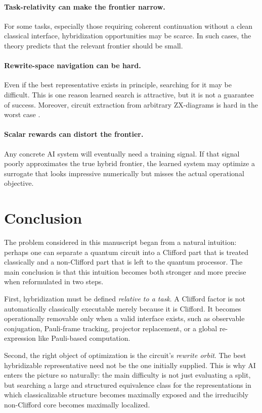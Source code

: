 \documentclass[11pt]{article}
\theoremstyle{remark}
\begin{document}
\paragraph{Task-relativity can make the frontier narrow.}
For some tasks, especially those requiring coherent continuation without a clean classical interface, hybridization opportunities may be scarce. In such cases, the theory predicts that the relevant frontier should be small.

\paragraph{Rewrite-space navigation can be hard.}
Even if the best representative exists in principle, searching for it may be difficult. This is one reason learned search is attractive, but it is not a guarantee of success. Moreover, circuit extraction from arbitrary ZX-diagrams is hard in the worst case \cite{debeaudrap_et_al_2022}.

\paragraph{Scalar rewards can distort the frontier.}
Any concrete AI system will eventually need a training signal. If that signal poorly approximates the true hybrid frontier, the learned system may optimize a surrogate that looks impressive numerically but misses the actual operational objective.

\section{Conclusion}

The problem considered in this manuscript began from a natural intuition: perhaps one can separate a quantum circuit into a Clifford part that is treated classically and a non-Clifford part that is left to the quantum processor. The main conclusion is that this intuition becomes both stronger and more precise when reformulated in two steps.

First, hybridization must be defined \emph{relative to a task}. A Clifford factor is not automatically classically executable merely because it is Clifford. It becomes operationally removable only when a valid interface exists, such as observable conjugation, Pauli-frame tracking, projector replacement, or a global re-expression like Pauli-based computation.

Second, the right object of optimization is the circuit's \emph{rewrite orbit}. The best hybridizable representative need not be the one initially supplied. This is why AI enters the picture so naturally: the main difficulty is not just evaluating a split, but searching a large and structured equivalence class for the representations in which classicalizable structure becomes maximally exposed and the irreducibly non-Clifford core becomes maximally localized.
\end{document}
